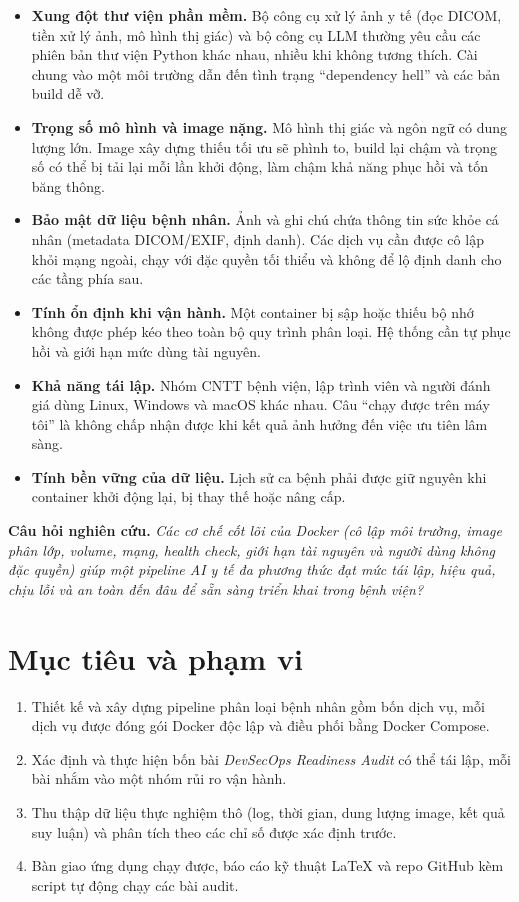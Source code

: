 \documentclass[11pt,a4paper]{article}
\begin{document}
\begin{itemize}
  \item \textbf{Xung đột thư viện phần mềm.} Bộ công cụ xử lý ảnh y tế (đọc DICOM, tiền xử lý ảnh, mô hình thị giác) và bộ công cụ LLM thường yêu cầu các phiên bản thư viện Python khác nhau, nhiều khi không tương thích. Cài chung vào một môi trường dẫn đến tình trạng ``dependency hell'' và các bản build dễ vỡ.
  \item \textbf{Trọng số mô hình và image nặng.} Mô hình thị giác và ngôn ngữ có dung lượng lớn. Image xây dựng thiếu tối ưu sẽ phình to, build lại chậm và trọng số có thể bị tải lại mỗi lần khởi động, làm chậm khả năng phục hồi và tốn băng thông.
  \item \textbf{Bảo mật dữ liệu bệnh nhân.} Ảnh và ghi chú chứa thông tin sức khỏe cá nhân (metadata DICOM/EXIF, định danh). Các dịch vụ cần được cô lập khỏi mạng ngoài, chạy với đặc quyền tối thiểu và không để lộ định danh cho các tầng phía sau.
  \item \textbf{Tính ổn định khi vận hành.} Một container bị sập hoặc thiếu bộ nhớ không được phép kéo theo toàn bộ quy trình phân loại. Hệ thống cần tự phục hồi và giới hạn mức dùng tài nguyên.
  \item \textbf{Khả năng tái lập.} Nhóm CNTT bệnh viện, lập trình viên và người đánh giá dùng Linux, Windows và macOS khác nhau. Câu ``chạy được trên máy tôi'' là không chấp nhận được khi kết quả ảnh hưởng đến việc ưu tiên lâm sàng.
  \item \textbf{Tính bền vững của dữ liệu.} Lịch sử ca bệnh phải được giữ nguyên khi container khởi động lại, bị thay thế hoặc nâng cấp.
\end{itemize}

\textbf{Câu hỏi nghiên cứu.} \emph{Các cơ chế cốt lõi của Docker (cô lập môi trường, image phân lớp, volume, mạng, health check, giới hạn tài nguyên và người dùng không đặc quyền) giúp một pipeline AI y tế đa phương thức đạt mức tái lập, hiệu quả, chịu lỗi và an toàn đến đâu để sẵn sàng triển khai trong bệnh viện?}

\section{Mục tiêu và phạm vi}
\begin{enumerate}
  \item Thiết kế và xây dựng pipeline phân loại bệnh nhân gồm bốn dịch vụ, mỗi dịch vụ được đóng gói Docker độc lập và điều phối bằng Docker Compose.
  \item Xác định và thực hiện bốn bài \emph{DevSecOps Readiness Audit} có thể tái lập, mỗi bài nhắm vào một nhóm rủi ro vận hành.
  \item Thu thập dữ liệu thực nghiệm thô (log, thời gian, dung lượng image, kết quả suy luận) và phân tích theo các chỉ số được xác định trước.
  \item Bàn giao ứng dụng chạy được, báo cáo kỹ thuật LaTeX và repo GitHub kèm script tự động chạy các bài audit.
\end{enumerate}
\end{document}
